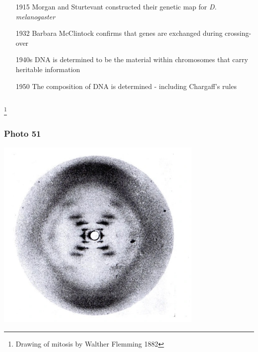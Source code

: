 \documentclass{beamer}
\newcommand\blfootnote[1]{%
	\begingroup
	\renewcommand\thefootnote{}\footnote{#1}%
	\addtocounter{footnote}{-1}%
	\endgroup
}
\begin{document}
\begin{frame}
\begin{columns}
\begin{column}{0.6\textwidth}
					\begin{itemize}
						\small
						\item[1915] Morgan and Sturtevant constructed their genetic map for \textit{D. melanogaster}
						\item[1932] Barbara McClintock confirms that genes are exchanged during crossing-over
						\item[1940s] DNA is determined to be the material within chromosomes that carry heritable information
						\item[1950] The composition of DNA is determined - including Chargaff's rules
						
	
						
					\end{itemize}
				\end{column}
				
			\end{columns}
			\blfootnote{Drawing of mitosis by Walther Flemming 1882}
			
			
		\end{frame}
		
		
		
		
		
		\begin{frame}
				\frametitle{Photo 51}
				\centering
			\includegraphics[keepaspectratio, width  =0.75\textwidth]{img/photo_51} 
		\end{frame}
		
\end{document}
